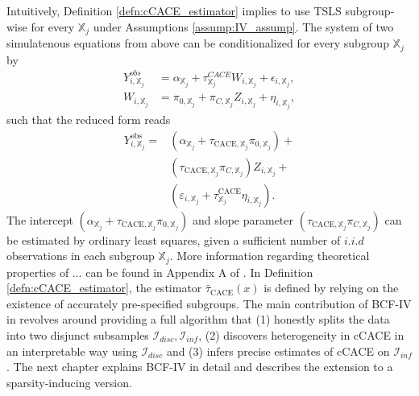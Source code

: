 Intuitively, Definition \ref{defn:cCACE_estimator} implies to use TSLS subgroup-wise for every $\mathbb{X}_j$ under Assumptions \ref{assump:IV_assump}. The system of two simulatenous equations from above can be conditionalized for every subgroup $\mathbb{X}_j$ by 
\begin{align*}
   Y_{i, \mathbb{X}_j}^{obs} &= \alpha_{\mathbb{X}_j} + \tau_{\mathbb{X}_j}^{CACE} W_{i, \mathbb{X}_j} + \epsilon_{i, \mathbb{X}_j}, \\
   W_{i, \mathbb{X}_j} &= \pi_{0, \mathbb{X}_j} + \pi_{C, \mathbb{X}_j} Z_{i, \mathbb{X}_j} + \eta_{i, \mathbb{X}_j},
\end{align*}
such that the reduced form reads 
\begin{align*}
   Y_{i,\mathbb{X}_j}^{\text{obs}} = &\left( \alpha_{\mathbb{X}_j} +
    \tau_{\text{CACE},\mathbb{X}_j} \pi_{0,\mathbb{X}_j} \right) + \\
     &\left( \tau_{\text{CACE},\mathbb{X}_j} \pi_{C,\mathbb{X}_j} \right) Z_{i,\mathbb{X}_j} + \\
     &\left( \varepsilon_{i,\mathbb{X}_j} + \tau^{\text{CACE}}_{\mathbb{X}_j} \eta_{i,\mathbb{X}_j} \right).
\end{align*}
The intercept $\left( \alpha_{\mathbb{X}_j} + \tau_{\text{CACE},\mathbb{X}_j} \pi_{0,\mathbb{X}_j} \right)$ and slope parameter $\left( \tau_{\text{CACE},\mathbb{X}_j} \pi_{C,\mathbb{X}_j} \right)$ can be estimated by ordinary least squares, given a sufficient number of $i.i.d$ observations in each subgroup $\mathbb{X}_j$. More information regarding theoretical properties of ... can be found in Appendix A of \cite{bargagli-stoffi_heterogeneous_2022}. In Definition \ref{defn:cCACE_estimator}, the estimator $\widehat\tau_{\text{CACE}}(x)$ is defined by relying on the existence of accurately pre-specified subgroups. The main contribution of BCF-IV in \cite{bargagli-stoffi_heterogeneous_2022} revolves around providing a full algorithm that (1) honestly splits the data into two disjunct subsamples $\mathcal{I}_{disc}, \mathcal{I}_{inf}$, (2) discovers heterogeneity in cCACE in an interpretable way using $\mathcal{I}_{disc}$ and (3) infers precise estimates of cCACE on $\mathcal{I}_{inf}$. The next chapter explains BCF-IV in detail and describes the extension to a sparsity-inducing version.





